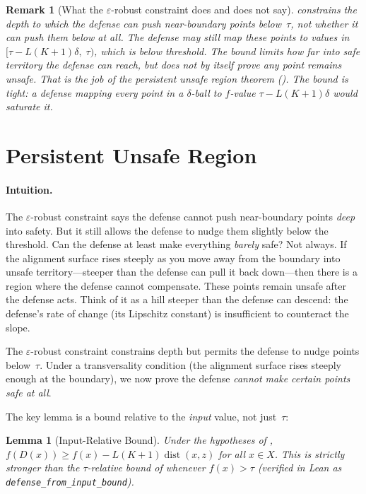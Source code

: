 \documentclass[11pt]{article}
\newtheorem{lemma}[theorem]{Lemma}
\newtheorem{remark}[theorem]{Remark}
\newcommand{\dist}{\operatorname{dist}}
\begin{document}
\begin{remark}[What the $\varepsilon$-robust constraint does and does not say]
 constrains the \emph{depth} to which the defense
can push near-boundary points below~$\tau$, not whether it can push
them below at all. The defense may still map these points to values in
$[\tau - L(K+1)\delta,\; \tau)$, which \emph{is} below threshold.
The bound limits how far into safe territory the defense can reach, but
does not by itself prove any point remains unsafe. That is the job of
the persistent unsafe region theorem (). The bound
is tight: a defense mapping every point in a $\delta$-ball to $f$-value
$\tau - L(K+1)\delta$ would saturate it.
\end{remark}


\section{Persistent Unsafe Region}
\label{sec:persistent}

\paragraph{Intuition.}
The $\varepsilon$-robust constraint says the defense cannot push
near-boundary points \emph{deep} into safety. But it still allows the
defense to nudge them slightly below the threshold. Can the defense at
least make everything \emph{barely} safe? Not always. If the alignment
surface rises steeply as you move away from the boundary into unsafe
territory---steeper than the defense can pull it back down---then
there is a region where the defense cannot compensate.
These points remain unsafe after the defense acts.
Think of it as a hill steeper than the defense can descend: the
defense's rate of change (its Lipschitz constant) is insufficient to
counteract the slope.

The $\varepsilon$-robust constraint constrains depth but permits the
defense to nudge points below~$\tau$. Under a transversality condition
(the alignment surface rises steeply enough at the boundary),
we now prove the defense \emph{cannot make certain points safe at all}.

The key lemma is a bound relative to the \emph{input} value, not
just~$\tau$:

\begin{lemma}[Input-Relative Bound]
\label{lem:input-bound}
Under the hypotheses of ,
$f(D(x)) \geq f(x) - L(K+1)\dist(x,z)$
for all $x \in X$. This is strictly stronger than the $\tau$-relative
bound of  whenever $f(x) > \tau$ (verified in Lean
as \texttt{defense\_from\_input\_bound}).
\end{lemma}
\end{document}

